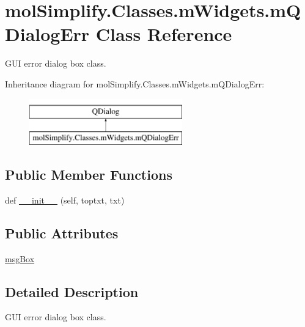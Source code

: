 \hypertarget{classmolSimplify_1_1Classes_1_1mWidgets_1_1mQDialogErr}{}\section{mol\+Simplify.\+Classes.\+m\+Widgets.\+m\+Q\+Dialog\+Err Class Reference}
\label{classmolSimplify_1_1Classes_1_1mWidgets_1_1mQDialogErr}


G\+UI error dialog box class.  


Inheritance diagram for mol\+Simplify.\+Classes.\+m\+Widgets.\+m\+Q\+Dialog\+Err\+:\begin{figure}[H]
\begin{center}
\leavevmode
\includegraphics[height=2.000000cm]{classmolSimplify_1_1Classes_1_1mWidgets_1_1mQDialogErr}
\end{center}
\end{figure}
\subsection*{Public Member Functions}
\begin{DoxyCompactItemize}
\item 
def \hyperlink{classmolSimplify_1_1Classes_1_1mWidgets_1_1mQDialogErr_a46f42e7b843eead634804993b34a6f60}{\+\_\+\+\_\+init\+\_\+\+\_\+} (self, toptxt, txt)
\end{DoxyCompactItemize}
\subsection*{Public Attributes}
\begin{DoxyCompactItemize}
\item 
\hyperlink{classmolSimplify_1_1Classes_1_1mWidgets_1_1mQDialogErr_a7cd18fb34503fbea7ef86c42dde7de4c}{msg\+Box}
\end{DoxyCompactItemize}


\subsection{Detailed Description}
G\+UI error dialog box class. 

